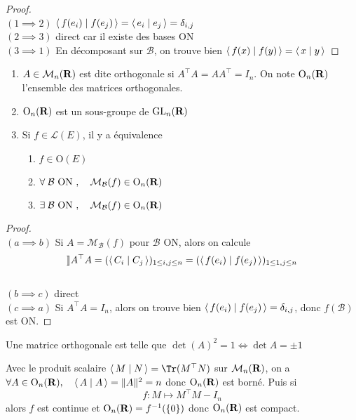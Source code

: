 \begin{proof}~\\
    $(1\implies 2)$ $ \scalar{f(e_i)}{f(e_j)} = \scalar{e_i}{e_j} =\delta_{i,j}$\\
    $(2\implies 3)$ direct car il existe des bases ON\\
    $(3\implies 1)$ En décomposant sur $\mathcal  B$, on trouve bien $\scalar{f(x)}{f(y)} = \scalar{x}{y} $
\end{proof}

\begin{thmdef}
\begin{enumerate}
    \item $A \in  \mathcal  M_n(\mathbf R)$ est dite orthogonale si $A^\top A=AA^\top=I_n$. On note  $\mathrm  O_n(\mathbf R)$ l'ensemble des matrices orthogonales.
    \item $\mathrm  O_n(\mathbf R)$ est un sous-groupe de $\mathrm {GL}_n(\mathbf R)$
    \item Si $f \in  \mathcal  L(E)$, il y a équivalence \begin{enumerate}
        \item $f \in  \mathrm  O(E)$
        \item $\forall  \; \mathcal  B \text{ ON }, \quad  \mathcal M_{\mathcal  B}(f) \in  \mathrm  O_n(\mathbf R)$
        \item $\exists  \; \mathcal  B \text{ ON }, \quad  \mathcal M_{\mathcal  B}(f) \in  \mathrm  O_n(\mathbf R)$
    \end{enumerate}
\end{enumerate}
\end{thmdef}

\begin{proof}
~\\ $(a\implies b)$ Si $A=\mathcal  M_{\mathcal  B}(f)$ pour $\mathcal  B$ ON, alors on calcule \[ \rrbracket A^\top A=( \scalar{C_i}{C_j}  )_{1\leq i,j\leq n}=( \scalar{f(e_i)}{f(e_j)}  )_{1\leq 1,j\leq n} \]\\
$(b\implies c)$ direct \\
$(c\implies a)$ Si $A^\top A=I_n$, alors on trouve bien  $\scalar{f(e_i)}{f(e_j)} =\delta_{i,j}$, donc $f(\mathcal  B)$ est ON.
\end{proof}

\begin{rem}
    Une matrice orthogonale est telle que $\det(A)^2=1 \iff  \det A=\pm1$
\end{rem}

\begin{rem}
    Avec le produit scalaire $\scalar{M}{N} = \Tr(M^\top N)$ sur $\mathcal  M_n(\mathbf R)$, on a $\forall  A \in  \mathrm  O_n(\R), \quad  \scalar{A}{A} = \|A\|^2 =n$ donc $\mathrm  O_n(\mathbf R)$ est borné. Puis si \[
    f:M\longmapsto M^\top M-I_n
    \] 
    alors $f$ est continue et  $\mathrm  O_n(\mathbf R)=f^{-1}(\left\{  0 \right\} )$ donc $\mathrm  O_n(\mathbf R)$ est compact.
\end{rem}
